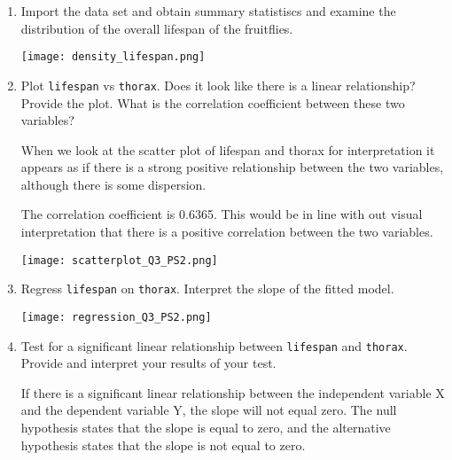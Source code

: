 \documentclass[12pt,letterpaper]{article}
\begin{document}
	\begin{enumerate}
		
		\item
		Import the data set and obtain summary statistiscs and examine the distribution of the overall lifespan of the fruitflies.  
		
	\vspace{.5cm}
	  
	\texttt{[image: density\_lifespan.png]}
	\vspace{.5cm}
	
  
 
		
		\newpage
		\item
		Plot \texttt{lifespan} vs \texttt{thorax}. Does it look like there is a linear relationship? Provide the plot. What is the correlation coefficient between these two variables?
		\vspace{0.25cm}
		  
		\vspace{0.25cm}
		When we look at the scatter plot of lifespan and thorax for interpretation it appears as if there is a strong positive relationship between the two variables, although there is some dispersion. 
		
		
		
		The correlation coefficient is 0.6365. This would be in line with out visual interpretation that there is a positive correlation between the two variables. 
		
		
	
		\texttt{[image: scatterplot\_Q3\_PS2.png]}
        \vspace{1.25cm}
		\item
		Regress \texttt{lifespan} on \texttt{thorax}.  Interpret the slope of the fitted model.
		\vspace{0.25cm}
		
		\texttt{[image: regression\_Q3\_PS2.png]}
        \vspace{1.25cm}
		\vspace{6cm}
		\item
		Test for a significant linear relationship between  \texttt{lifespan} and \texttt{thorax}. Provide and interpret your results of your test.
		\vspace{0.25cm}
		
		\vspace{0.25cm}
		If there is a significant linear relationship between the independent variable X and the dependent variable Y, the slope will not equal zero. The null hypothesis states that the slope is equal to zero, and the alternative hypothesis states that the slope is not equal to zero.
		

\end{enumerate}
\end{document}
